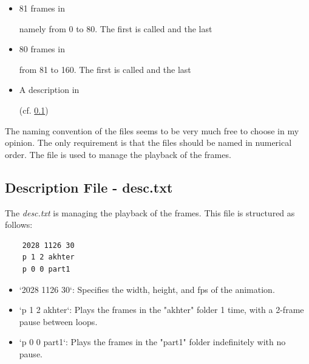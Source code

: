   \begin{itemize}
    \item 81 frames in
    namely from 0 to 80. The first is called  and the last 

    \item 80 frames in
    from 81 to 160. The first is called  and the last 

    \item A description in
    (cf. \ref{subsec:desc-txt})
  \end{itemize}

  The naming convention of the files seems to be very much free to choose in my opinion. The only requirement is that the files should be named in numerical order. The  file is used to manage the playback of the frames.

  \subsection{Description File - desc.txt}
  \label{subsec:desc-txt}

  The \emph{desc.txt} is managing the playback of the frames. This file is structured as follows:

  \begin{verbatim}
    2028 1126 30
    p 1 2 akhter
    p 0 0 part1
  \end{verbatim}

    \begin{itemize}
        \item `2028 1126 30`: Specifies the width, height, and \gls{fps} of the animation.
        \item `p 1 2 akhter`: Plays the frames in the "akhter" folder 1 time, with a 2-frame pause between loops.
        \item `p 0 0 part1`: Plays the frames in the "part1" folder indefinitely with no pause.
    \end{itemize}

